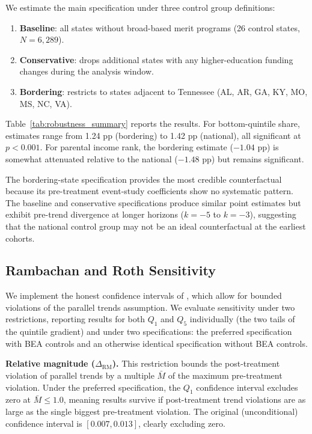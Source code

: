 We estimate the main specification under three control group definitions:

\begin{enumerate}
\item \textbf{Baseline}: all states without broad-based merit programs
  (26 control states, $N = 6{,}289$).
\item \textbf{Conservative}: drops additional states with any
  higher-education funding changes during the analysis window.
\item \textbf{Bordering}: restricts to states adjacent to Tennessee
  (AL, AR, GA, KY, MO, MS, NC, VA).
\end{enumerate}

Table~\ref{tab:robustness_summary} reports the results. For
bottom-quintile share, estimates range from 1.24 pp (bordering) to 1.42 pp
(national), all significant at $p < 0.001$. For parental income rank,
the bordering estimate ($-1.04$ pp) is somewhat attenuated relative to
the national ($-1.48$ pp) but remains significant.

The bordering-state specification provides the most credible
counterfactual because its pre-treatment event-study coefficients show
no systematic pattern. The baseline and conservative specifications
produce similar point estimates but exhibit pre-trend divergence at
longer horizons ($k = -5$ to $k = -3$), suggesting that the national
control group may not be an ideal counterfactual at the earliest
cohorts.

\subsection{Rambachan and Roth Sensitivity}
\label{sec:robustness_rr}

We implement the honest confidence intervals of
\textcite{rambachan2023more}, which allow for bounded violations of the
parallel trends assumption. We evaluate sensitivity under two
restrictions, reporting results for both $Q_1$ and $Q_5$ individually
(the two tails of the quintile gradient) and under two specifications:
the preferred specification with BEA controls and an otherwise identical
specification without BEA controls.

\textbf{Relative magnitude ($\Delta_\text{RM}$).} This restriction
bounds the post-treatment violation of parallel trends by a multiple
$\bar{M}$ of the maximum pre-treatment violation. Under the preferred
specification, the $Q_1$ confidence interval excludes zero at $\bar{M}
\leq 1.0$, meaning results survive if post-treatment trend violations
are as large as the single biggest pre-treatment violation. The
original (unconditional) confidence interval is $[0.007, 0.013]$,
clearly excluding zero.

